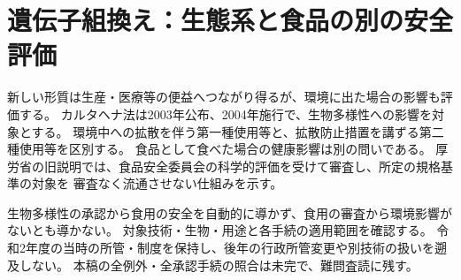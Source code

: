 \section{遺伝子組換え：生態系と食品の別の安全評価}
\label{theory:sustainability:gmo}
新しい形質は生産・医療等の便益へつながり得るが、環境に出た場合の影響も評価する。
カルタヘナ法は2003年公布、2004年施行で、生物多様性への影響を対象とする。
環境中への拡散を伴う第一種使用等と、拡散防止措置を講ずる第二種使用等を区別する。\cite{saf53_cartagena}
食品として食べた場合の健康影響は別の問いである。
厚労省の旧説明では、食品安全委員会の科学的評価を受けて審査し、所定の規格基準の対象を
審査なく流通させない仕組みを示す。\cite{saf53_gmo_food2004,saf53_gmo_standards2000}

生物多様性の承認から食用の安全を自動的に導かず、食用の審査から環境影響がないとも導かない。
対象技術・生物・用途と各手続の適用範囲を確認する。
令和2年度の当時の所管・制度を保持し、後年の行政所管変更や別技術の扱いを遡及しない。
本稿の全例外・全承認手続の照合は未完で、難問査読に残す。

